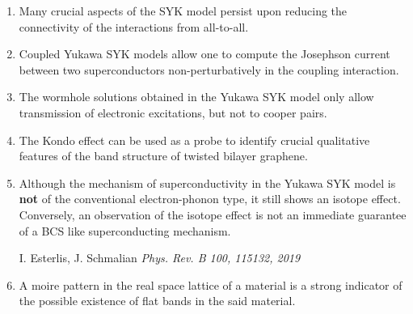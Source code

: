 \documentclass[pdftex,a5paper]{dissertation}
\begin{document}
{\small
\begin{enumerate}[leftmargin=*]
\setlength\itemsep{0.8em}

\item Many crucial aspects of the SYK model persist upon reducing the connectivity of the interactions from all-to-all.
\vspace{-10pt}
\begin{flushright}
\end{flushright}

\item Coupled Yukawa SYK models allow one to compute the Josephson current between two superconductors non-perturbatively in the coupling interaction.  
\vspace{-10pt}
\begin{flushright}
\end{flushright}

\item The wormhole solutions obtained in the Yukawa SYK model only allow transmission of electronic excitations, but not to cooper pairs. 
\vspace{-10pt}
\begin{flushright}
\end{flushright}

\item The Kondo effect can be used as a probe to identify crucial qualitative features of the band structure of twisted bilayer graphene. 
\vspace{-10pt}
\begin{flushright}
\end{flushright}


\item Although the mechanism of superconductivity in the Yukawa SYK model is \textbf{not} of the conventional electron-phonon type, it still shows an isotope effect. Conversely, an observation of the isotope effect is not an immediate guarantee of a BCS like superconducting mechanism. 
\vspace{-2pt}
\begin{flushright}
	I. Esterlis, J. Schmalian \emph{Phys. Rev. B 100, 115132, 2019} 
\end{flushright}

\item A moire pattern in the real space lattice of a material is a strong indicator of the possible existence of flat bands in the said material. 


\end{enumerate}}
\end{document}
